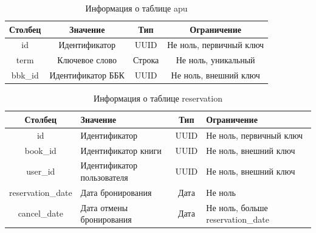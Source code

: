\begin{table}[H]
    \begin{center}
        \caption{Информация о таблице apu}
        \begin{tabular}{|c|c|c|c|}
            \hline
            \textbf{Столбец} & \textbf{Значение} & \textbf{Тип} & \textbf{Ограничение} \\
            \hline
            id & Идентификатор & UUID & Не ноль, первичный ключ \\
            \hline
            term & Ключевое слово & Строка & Не ноль, уникальный \\
            \hline
            bbk\_id & Идентификатор ББК & UUID & Не ноль, внешний ключ \\
            \hline
        \end{tabular}
    \end{center}
\end{table}

\begin{table}[H]
    \begin{center}
        \caption{Информация о таблице reservation}
        \begin{tabular}{|c|p{4cm}|c|p{4cm}|}
            \hline
            \textbf{Столбец} & \textbf{Значение} & \textbf{Тип} & \textbf{Ограничение} \\
            \hline
            id & Идентификатор & UUID & Не ноль, первичный ключ \\
            \hline
            book\_id & Идентификатор книги & UUID & Не ноль, внешний ключ \\
            \hline
            user\_id & Идентификатор пользователя & UUID & Не ноль, внешний ключ \\
            \hline
            reservation\_date & Дата бронирования & Дата & Не ноль \\
            \hline
            cancel\_date & Дата отмены бронирования & Дата & Не ноль, больше reservation\_date \\
            \hline
        \end{tabular}
    \end{center}
\end{table}

